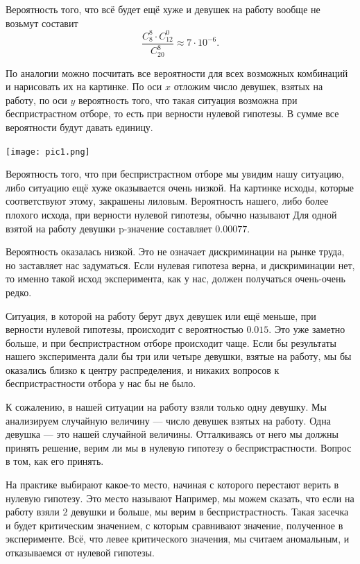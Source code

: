 \documentclass[12pt, a4paper, oneside]{article}
\begin{document}
Вероятность того, что всё будет ещё хуже и девушек на работу вообще не возьмут составит \[ \frac{C_8^8 \cdot C_{12}^0}{C_{20}^8} \approx 7 \cdot 10^{-6}. \] 

По аналогии можно посчитать все вероятности для всех возможных комбинаций и нарисовать их на картинке. По оси $x$ отложим число девушек, взятых на работу, по оси $y$ вероятность того, что такая ситуация возможна при беспристрастном отборе, то есть при верности нулевой гипотезы. В сумме все вероятности будут давать единицу. 

\begin{center} 
\texttt{[image: pic1.png]}
\end{center} 

Вероятность того, что при беспристрастном отборе мы увидим нашу ситуацию, либо ситуацию ещё хуже оказывается очень низкой. На картинке исходы, которые соответствуют этому, закрашены лиловым. Вероятность нашего, либо более плохого исхода, при верности нулевой гипотезы, обычно называют   Для одной взятой на работу девушки p-значение составляет $0.00077$.

Вероятность оказалась низкой. Это не означает дискриминации на рынке труда, но заставляет нас задуматься. Если нулевая гипотеза верна, и дискриминации нет, то именно такой исход эксперимента, как у нас, должен получаться очень-очень редко. 

Ситуация, в которой на работу берут двух девушек или ещё меньше, при верности нулевой гипотезы, происходит с вероятностью $0.015$. Это уже заметно больше, и при беспристрастном отборе происходит чаще. Если бы результаты нашего эксперимента дали бы три или четыре девушки, взятые на работу, мы бы оказались близко к центру распределения, и никаких вопросов к беспристрастности отбора у нас бы не было. 

К сожалению, в нашей ситуации на работу взяли только одну девушку. Мы анализируем случайную величину --- число девушек взятых на работу. Одна девушка --- это  нашей случайной величины. Отталкиваясь от него мы должны принять решение, верим ли мы в нулевую гипотезу о беспристрастности. Вопрос в том, как его принять. 

На практике выбирают какое-то место, начиная с которого перестают верить в нулевую гипотезу. Это место называют  Например, мы можем сказать, что если на работу взяли $2$ девушки и больше, мы верим в беспристрастность. Такая засечка и будет критическим значением, с которым сравнивают значение, полученное в эксперименте. Всё, что левее критического значения, мы считаем аномальным, и отказываемся от нулевой гипотезы. 
\end{document}
